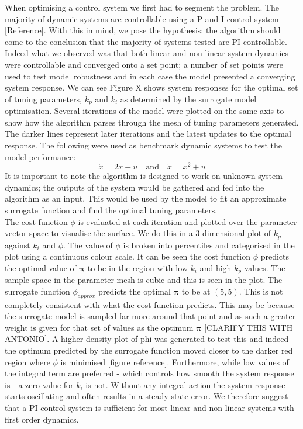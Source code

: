 \documentclass[conference]{IEEEtran}
\theoremstyle{definition}
\begin{document}
When optimising a control system we first had to segment the problem. The majority of dynamic systems are controllable using a P and I control system [Reference]. With this in mind, we pose the hypothesis: the algorithm should come to the conclusion that the majority of systems tested are PI-controllable. Indeed what we observed was that both linear and non-linear system dynamics were controllable and converged onto a set point; a number of set points were used to test model robustness and in each case the model presented a converging system response. We can see Figure X shows system responses for the optimal set of tuning parameters, $k_p$ and $k_i$  as determined by the surrogate model optimisation. Several iterations of the model were plotted on the same axis to show how the algorithm parses through the mesh of tuning parameters generated. The darker lines represent later iterations and the latest updates to the optimal response. The following were used as benchmark dynamic systems to test the model performance:
\begin{equation}
\dot{x} = 2x +u \quad \textrm{and} \quad \dot{x} = x^2 + u
\end{equation}
It is important to note the algorithm is designed to work on unknown system dynamics; the outputs of the system would be gathered and fed into the algorithm as an input. This would be used by the model to fit an approximate surrogate function and find the optimal tuning parameters.\\
The cost function $\phi$ is evaluated at each iteration and plotted over the parameter vector space to visualise the surface. We do this in a 3-dimensional plot of $k_p$ against $k_i$ and $\phi$. The value of $\phi$ is broken into percentiles and categorised in the plot using a continuous colour scale. It can be seen the cost function $\phi$ predicts the optimal value of $\boldsymbol \pi$ to be in the region with low $k_i$ and high $k_p$ values. The sample space in the parameter mesh is cubic and this is seen in the plot. The surrogate function $\phi_{approx}$ predicts the optimal $\boldsymbol \pi$ to be at $(5,5)$. This is not completely consistent with what the cost function predicts. This may be because the surrogate model is sampled far more around that point and as such a greater weight is given for that set of values as the optimum $\boldsymbol \pi$ [CLARIFY THIS WITH ANTONIO]. A higher density plot of phi was generated to test this and indeed the optimum predicted by the surrogate function moved closer to the darker red region where $\phi$ is minimised [figure reference].
Furthermore, while low values of the integral term are preferred - which controls how smooth the system response is - a zero value for $k_i$ is not. Without any integral action the system response starts oscillating and often results in a steady state error. We therefore suggest that a PI-control system is sufficient for most linear and non-linear systems with first order dynamics. 
\end{document}
